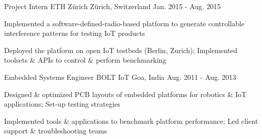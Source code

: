 \begin{cventries}
  \cventry
    {Project Intern} %
    {ETH Zürich} %
    {Zürich, Switzerland} %
    {Jan. 2015 - Aug. 2015} %
    {
      \begin{cvitems} %
      	\item {Implemented a software-defined-radio-based platform to generate controllable interference patterns for testing IoT products}
        \item {Deployed the platform on open IoT testbeds (Berlin, Zurich); Implemented toolsets \& APIs to control \& perform benchmarking}
      \end{cvitems}
    }

  \cventry
    {Embedded Systems Engineer} %
    {BOLT IoT} %
    {Goa, India} %
    {Aug. 2011 - Aug. 2013} %
    {
      \begin{cvitems} %
      	\item {Designed \& optimized PCB layouts of embedded platforms for robotics \& IoT applications; Set-up testing strategies}
        \item {Implemented tools \& applications to benchmark platform performance; Led client support \& troubleshooting teams}
      \end{cvitems}
    }
    
    \vspace{-0.4cm}

\end{cventries}
